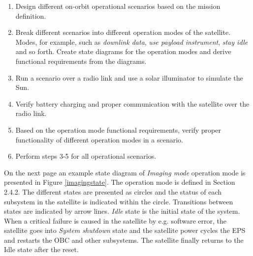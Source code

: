 \documentclass[english,12pt,a4paper,pdftex,elec,utf8]{aaltothesis}
\begin{document}
\begin{enumerate}
\item Design different on-orbit operational scenarios based on the mission definition.
\item Break different scenarios into different operation modes of the satellite. Modes, for example, such as \textit{downlink data}, \textit{use payload instrument}, \textit{stay idle} and so forth. Create state diagrams for the operation modes and derive functional requirements from the diagrams.
\item Run a scenario over a radio link and use a solar illuminator to simulate the Sun.
\item Verify battery charging and proper communication with the satellite over the radio link.
\item Based on the operation mode functional requirements, verify proper functionality of different operation modes in a scenario.
\item Perform steps 3-5 for all operational scenarios. 
\end{enumerate}
On the next page an example state diagram of \textit{Imaging mode} operation mode is presented in Figure \ref{imagingstate}. The operation mode is defined in Section 2.4.2. The different states are presented as circles and the status of each subsystem in the satellite is indicated within the circle. Transitions between states are indicated by arrow lines. \textit{Idle} state is the initial state of the system. When a critical failure is caused in the satellite by e.g. software error, the satellite goes into \textit{System shutdown} state and the satellite power cycles the EPS and restarts the OBC and other subsystems. The satellite finally returns to the Idle state after the reset.
\end{document}
